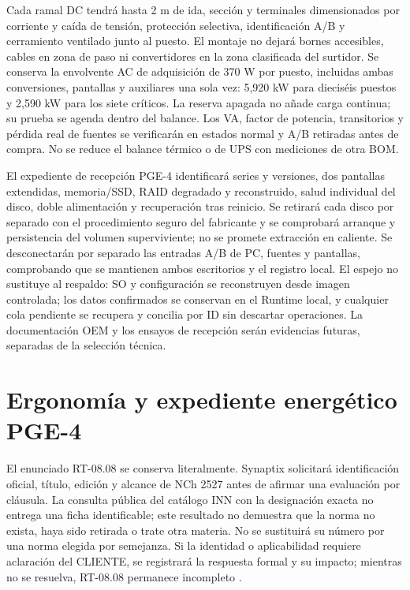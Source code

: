 Cada ramal DC tendrá hasta 2 m de ida, sección y terminales dimensionados por corriente y caída de tensión, protección selectiva, identificación A/B y cerramiento ventilado junto al puesto. El montaje no dejará bornes accesibles, cables en zona de paso ni convertidores en la zona clasificada del surtidor. Se conserva la envolvente AC de adquisición de 370 W por puesto, incluidas ambas conversiones, pantallas y auxiliares una sola vez: 5,920 kW para dieciséis puestos y 2,590 kW para los siete críticos. La reserva apagada no añade carga continua; su prueba se agenda dentro del balance. Los VA, factor de potencia, transitorios y pérdida real de fuentes se verificarán en estados normal y A/B retiradas antes de compra. No se reduce el balance térmico o de UPS con mediciones de otra BOM.

El expediente de recepción PGE-4 identificará series y versiones, dos pantallas extendidas, memoria/SSD, RAID degradado y reconstruido, salud individual del disco, doble alimentación y recuperación tras reinicio. Se retirará cada disco por separado con el procedimiento seguro del fabricante y se comprobará arranque y persistencia del volumen superviviente; no se promete extracción en caliente. Se desconectarán por separado las entradas A/B de PC, fuentes y pantallas, comprobando que se mantienen ambos escritorios y el registro local. El espejo no sustituye al respaldo: SO y configuración se reconstruyen desde imagen controlada; los datos confirmados se conservan en el Runtime local, y cualquier cola pendiente se recupera y concilia por ID sin descartar operaciones. La documentación OEM y los ensayos de recepción serán evidencias futuras, separadas de la selección técnica.

\section{Ergonomía y expediente energético PGE-4}
\label{sec:sd4-pge4-ergonomia}
El enunciado RT-08.08 se conserva literalmente. Synaptix solicitará identificación oficial, título, edición y alcance de NCh 2527 antes de afirmar una evaluación por cláusula. La consulta pública del catálogo INN con la designación exacta no entrega una ficha identificable; este resultado no demuestra que la norma no exista, haya sido retirada o trate otra materia. No se sustituirá su número por una norma elegida por semejanza. Si la identidad o aplicabilidad requiere aclaración del CLIENTE, se registrará la respuesta formal y su impacto; mientras no se resuelva, RT-08.08 permanece incompleto \parencites[RT-08.08]{pucv-transversal}{p15-inn-busqueda}.

